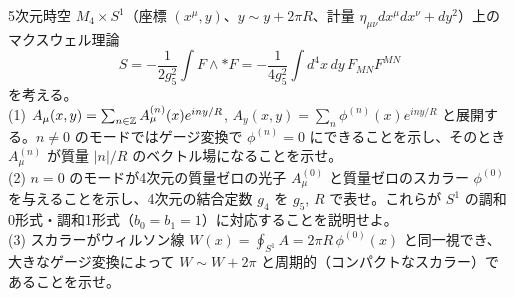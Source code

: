 \begin{problem}[難易度 C]\label{ch05-prob-kk}
5次元時空 $M_4\times S^1$（座標 $(x^\mu,y)$、$y\sim y+2\pi R$、計量 $\eta_{\mu\nu}dx^\mu dx^\nu+dy^2$）上のマクスウェル理論
\[
S=-\frac1{2g_5^2}\int F\wedge{*F}=-\frac{1}{4g_5^2}\int d^4x\,dy\,F_{MN}F^{MN}
\]
を考える。\\
(1) $A_\mu(x,y)=\sum_{n\in\mathbb{Z}}A^{(n)}_\mu(x)e^{iny/R}$, $A_y(x,y)=\sum_n\phi^{(n)}(x)e^{iny/R}$ と展開する。$n\neq0$ のモードではゲージ変換で $\phi^{(n)}=0$ にできることを示し、そのとき $A^{(n)}_\mu$ が質量 $\lvert n\rvert/R$ のベクトル場になることを示せ。\\
(2) $n=0$ のモードが4次元の質量ゼロの光子 $A_\mu^{(0)}$ と質量ゼロのスカラー $\phi^{(0)}$ を与えることを示し、4次元の結合定数 $g_4$ を $g_5$, $R$ で表せ。これらが $S^1$ の調和0形式・調和1形式（$b_0=b_1=1$）に対応することを説明せよ。\\
(3) スカラーがウィルソン線 $W(x)=\oint_{S^1}A=2\pi R\,\phi^{(0)}(x)$ と同一視でき、大きなゲージ変換によって $W\sim W+2\pi$ と周期的（コンパクトなスカラー）であることを示せ。
\end{problem}

